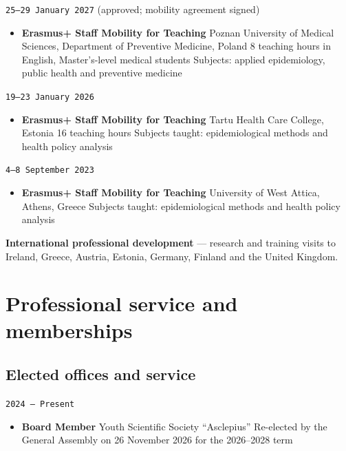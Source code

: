 \documentclass[
  10.5pt,
  a4paper,
  DIV=11,
  numbers=noendperiod]{scrartcl}
\providecommand{\tightlist}{%
  \setlength{\itemsep}{0pt}\setlength{\parskip}{0pt}}
\let\oldtexttt\texttt
\renewcommand{\texttt}[1]{{\color{cvbronze}\small\oldtexttt{#1}}}
\begin{document}
\texttt{25–29\ January\ 2027} (approved; mobility agreement signed)

\begin{itemize}
\tightlist
\item
  \textbf{Erasmus+ Staff Mobility for Teaching} \textbar{} Poznan
  University of Medical Sciences, Department of Preventive Medicine,
  Poland \textbar{} 8 teaching hours in English, Master's-level medical
  students \textbar{} Subjects: applied epidemiology, public health and
  preventive medicine
\end{itemize}

\texttt{19–23\ January\ 2026}

\begin{itemize}
\tightlist
\item
  \textbf{Erasmus+ Staff Mobility for Teaching} \textbar{} Tartu Health
  Care College, Estonia \textbar{} 16 teaching hours \textbar{} Subjects
  taught: epidemiological methods and health policy analysis
\end{itemize}

\texttt{4–8\ September\ 2023}

\begin{itemize}
\tightlist
\item
  \textbf{Erasmus+ Staff Mobility for Teaching} \textbar{} University of
  West Attica, Athens, Greece \textbar{} Subjects taught:
  epidemiological methods and health policy analysis
\end{itemize}

\textbf{International professional development} --- research and
training visits to Ireland, Greece, Austria, Estonia, Germany, Finland
and the United Kingdom.

\section{Professional service and
memberships}\label{professional-service-and-memberships}

\subsection{Elected offices and
service}\label{elected-offices-and-service}

\texttt{2024\ –\ Present}

\begin{itemize}
\tightlist
\item
  \textbf{Board Member} \textbar{} Youth Scientific Society
  ``Asclepius'' \textbar{} Re-elected by the General Assembly on 26
  November 2026 for the 2026--2028 term
\end{itemize}
\end{document}
